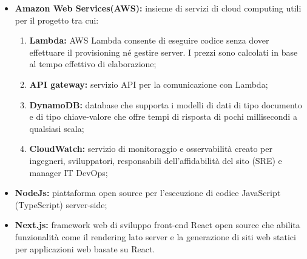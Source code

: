 \begin{itemize}
\item {\bf Amazon Web Services(AWS):} insieme di servizi di cloud computing utili per il progetto tra cui:
\begin{enumerate}
\item {\bf Lambda:} AWS Lambda consente di eseguire codice senza dover effettuare il provisioning né gestire server. I prezzi sono calcolati in base al tempo effettivo di elaborazione;
\item {\bf API gateway:} servizio API per la comunicazione con Lambda;
\item {\bf DynamoDB:} database che supporta i modelli di dati di tipo documento e di tipo chiave-valore che offre tempi di risposta di pochi millisecondi a qualsiasi scala;
\item {\bf CloudWatch:} servizio di monitoraggio e osservabilità creato per ingegneri, sviluppatori, responsabili dell'affidabilità del sito (SRE) e manager IT DevOps;
\end{enumerate}
\item {\bf NodeJs:} piattaforma open source per l'esecuzione di codice JavaScript (TypeScript) server-side;
\item {\bf Next.js:} framework web di sviluppo front-end React open source che abilita funzionalità come il rendering lato server e la generazione di siti web statici per applicazioni web basate su React. 
\end{itemize}
